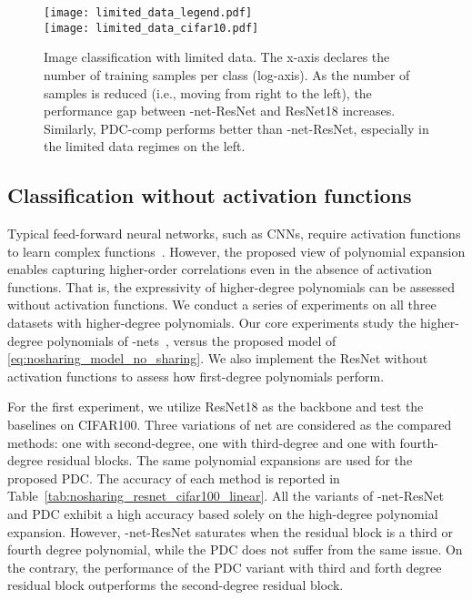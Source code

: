 \documentclass[runningheads]{llncs}
\newcommand{\resnet}{ResNet}
\newcommand{\modelres}{-net-\resnet}
\newcommand{\noshare}{PDC}
\begin{document}
\begin{figure}
\centering
    \centering
    \texttt{[image: limited\_data\_legend.pdf]} \\
    \texttt{[image: limited\_data\_cifar10.pdf]}
\caption{Image classification with limited data. The x-axis declares the number of training samples per class (log-axis). As the number of samples is reduced (i.e., moving from right to the left), the performance gap between \modelres{} and \resnet18 increases. Similarly, \noshare-comp performs better than \modelres, especially in the limited data regimes on the left.}
\label{fig:nosharing_experiment_limited_data}
\end{figure}


























\subsection{Classification without activation functions}

Typical feed-forward neural networks, such as CNNs, require activation functions to learn complex functions~\cite{hornik1989multilayer}. However, the proposed view of polynomial expansion enables capturing higher-order correlations even in the absence of activation functions.
That is, the expressivity of higher-degree polynomials can be assessed without activation functions. We conduct a series of experiments on all three datasets with higher-degree polynomials. Our core experiments study the higher-degree polynomials of -nets~\cite{chrysos2020poly}, versus the proposed model of \eqref{eq:nosharing_model_no_sharing}. We also implement the \resnet{} without activation functions to assess how first-degree polynomials perform. 

For the first experiment, we utilize \resnet18 as the backbone and test the baselines on CIFAR100. Three variations of net are considered as the compared methods: one with second-degree, one with third-degree and one with fourth-degree residual blocks. The same polynomial expansions are used for the proposed \noshare. 
The accuracy of each method is reported in Table~\ref{tab:nosharing_resnet_cifar100_linear}. All the variants of \modelres{} and \noshare{} exhibit a high accuracy based solely on the high-degree polynomial expansion. However, \modelres{} saturates when the residual block is a third or fourth degree polynomial, while the \noshare{} does not suffer from the same issue. On the contrary, the performance of the \noshare{} variant with third and forth degree residual block outperforms the second-degree residual block. 
\end{document}
